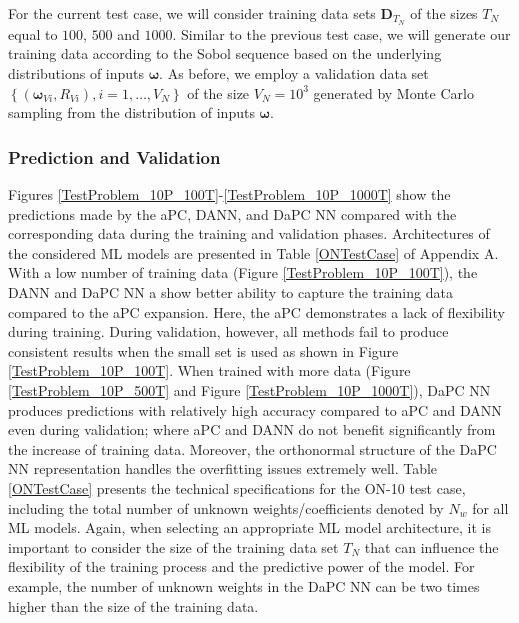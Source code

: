\documentclass[a4paper,fleqn]{article}
\newcommand{\rw}[1]{\textcolor{blue}{#1}}
\newcommand{\del}[1]{\textcolor{red}{\sout{#1}}}
\renewcommand{\del}[1]{}
\renewcommand{\rw}[1]{#1}
\begin{document}
For the current test case, we will consider training data sets $\bm{D}_{T_N}$ of the sizes $T_N$ equal to $100$, $500$ and $1000$. Similar to the previous test case, we will generate our training data according to the Sobol sequence \cite{sobol2011construction} based on the underlying distributions of inputs $\bm{\omega}$. As before, we employ a validation data set $\left\{(\bm{\omega}_{Vi},R_{Vi}), i=1,\ldots,V_N \right\}$ of the size $V_N=10^3$ generated by Monte Carlo sampling \cite{Smith1992} from the distribution of inputs $\bm{\omega}$.

\subsubsection{Prediction and Validation}
\label{Pred_ON}

Figures \ref{TestProblem_10P_100T}-\ref{TestProblem_10P_1000T} show the predictions made by the aPC, DANN, and DaPC NN compared with the corresponding data during the training and validation phases. Architectures of the considered ML models are presented in Table \ref{ONTestCase} of Appendix A. With a low number of training data (Figure \ref{TestProblem_10P_100T}), the DANN and DaPC NN a show better ability to capture the training data compared to the aPC expansion. Here, the aPC demonstrates a lack of flexibility during training. During validation, however, all methods fail to produce consistent results when the small set is used as shown in Figure \ref{TestProblem_10P_100T}. When trained with more data (Figure \ref{TestProblem_10P_500T} and Figure \ref{TestProblem_10P_1000T}), DaPC NN produces predictions with relatively high accuracy compared to aPC and DANN even during validation; where aPC and DANN do not benefit significantly from the increase of training data. Moreover, the orthonormal structure of the DaPC NN representation handles the overfitting issues extremely well. \rw{Table \ref{ONTestCase} presents the technical specifications for the ON-10 test case, including the total number of unknown weights/coefficients denoted by $N_w$ for all ML models. Again, when selecting an appropriate ML model architecture, it is important to consider the size of the training data set $T_N$ that can influence the flexibility of the training process and the predictive power of the model.} For example, the number of unknown weights in the DaPC NN \del{could} \rw{can} be two times higher than the size of the training data.
\end{document}
